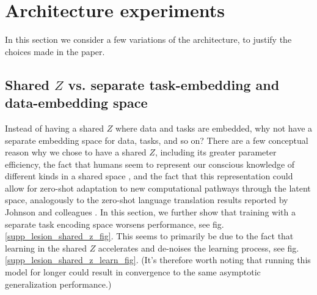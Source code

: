 \section{Architecture experiments} \label{app_lesion_results}
In this section we consider a few variations of the architecture, to justify the choices made in the paper. \par

\subsection{Shared $Z$ vs. separate task-embedding and data-embedding space} \label{app_lesion_results_shared_z}
Instead of having a shared $Z$ where data and tasks are embedded, why not have a separate embedding space for data, tasks, and so on? There are a few conceptual reason why we chose to have a shared $Z$, including its greater parameter efficiency, the fact that humans seem to represent our conscious knowledge of different kinds in a shared space \citep[][]{Baars2005}, and the fact that this representation could allow for zero-shot adaptation to new computational pathways through the latent space, analogously to the zero-shot language translation results reported by Johnson and colleagues \citep{Johnson2016a}. In this section, we further show that training with a separate task encoding space worsens performance, see fig. \ref{supp_lesion_shared_z_fig}. This seems to primarily be due to the fact that learning in the shared $Z$ accelerates and de-noises the learning process, see fig. \ref{supp_lesion_shared_z_learn_fig}. (It's therefore worth noting that running this model for longer could result in convergence to the same asymptotic generalization performance.) \par
